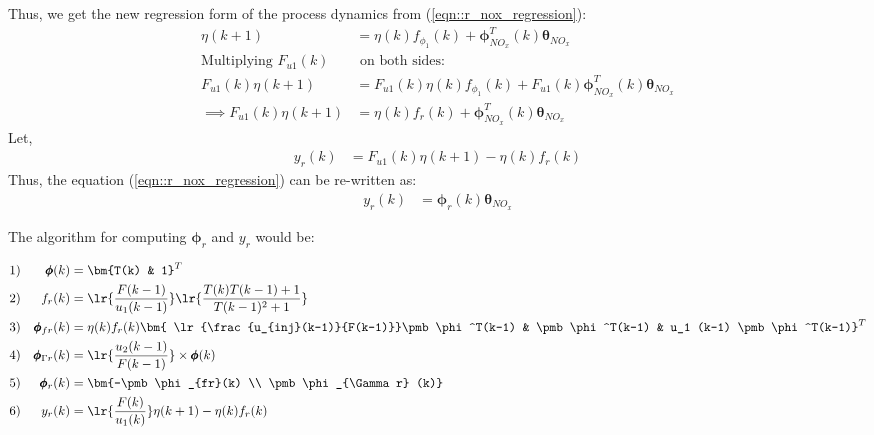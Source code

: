 Thus, we get the new regression form of the process dynamics from (\ref{eqn::r_nox_regression}):
\begin{align*}
          \eta (k+1) &=  \eta(k) f_{\phi_1}(k) +
                     \pmb \phi_{NO_x}^T (k) \pmb \theta_{NO_x}\\
        \text{Multiplying } F_{u1}(k) & \text{ on both sides:}\\
        F_{u1}(k) \eta (k+1) &=  F_{u1}(k) \eta(k) f_{\phi_1}(k) +
                                        F_{u1}(k) \pmb \phi_{NO_x}^T (k) \pmb \theta_{NO_x}\\
        \implies  F_{u1}(k) \eta (k+1) &= \eta(k) f_r (k) + \pmb \phi_{NO_x}^T (k) \pmb \theta_{NO_x}
\end{align*}
Let,
\begin{align}
       y_r(k) &= F_{u1}(k) \eta (k+1) - \eta(k) f_r (k)
\end{align}
Thus, the equation (\ref{eqn::r_nox_regression}) can be re-written as:
\begin{align}
       y_r(k) &= \pmb \phi_r(k) \pmb \theta_{NO_x}
\end{align}

The algorithm for computing $\pmb \phi_r$ and $y_r$ would be:

\begin{align*}
        1)&& \pmb \phi(k) &= \bm{T(k) & 1} ^T\\
        2)&& f_{r}(k) &= \lr{\frac{F(k-1)}{u_1(k-1)}} \lr{\frac{T(k)T(k-1) + 1}{T(k-1)^2 + 1}}\\
        3)&& \pmb \phi_{fr}(k) &= \eta(k) f_{r}(k)
                                \bm{ \lr{\frac{u_{inj}(k-1)}{F(k-1)}}\pmb \phi^T(k-1) &
                                    \pmb \phi^T(k-1)  &
                                    u_1 (k-1) \pmb \phi^T(k-1)} ^T   \\
        4)&& \pmb \phi_{\Gamma r}(k) &= \lr{\frac{u_2(k-1)}{F(k-1)}} \times \pmb \phi(k) \\
        5)&& \pmb \phi_{r}(k) &= \bm{-\pmb \phi_{fr}(k) \\ \pmb \phi_{\Gamma r} (k)} \\
        6)&& y_{r}(k) &= \lr{\frac{F(k)}{u_1(k)}} \eta (k+1) - \eta(k) f_r (k)
\end{align*}
